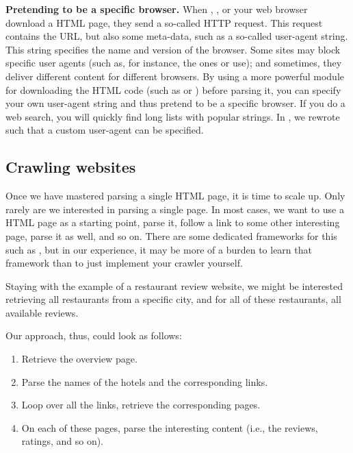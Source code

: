 \begin{feature}\textbf{Pretending to be a specific browser.}  When , , or your web browser download a HTML page, they send a so-called HTTP request. This request contains the URL, but also some meta-data, such as a so-called user-agent string. This string specifies the name and version of the browser. Some sites may block specific user agents (such as, for instance, the ones  or  use); and sometimes, they deliver different content for different browsers. By using a more powerful module for downloading the HTML code (such as  or ) before parsing it, you can specify your own user-agent string and thus pretend to be a specific browser. If you do a web search, you will quickly find long lists with popular strings. In , we rewrote  such that a custom user-agent can be specified. 
\end{feature}





\subsection{Crawling websites}
\label{sec:crawling}

Once we have mastered parsing a single HTML page, it is time to scale
up. Only rarely are we interested in parsing a single page. In most
cases, we want to use a HTML page as a starting point, parse it,
follow a link to some other interesting page, parse it as well, and so
on. There are some dedicated frameworks for this such as ,
but in our experience, it may be more of a burden to learn that
framework than to just implement your crawler yourself.

Staying with the example of a restaurant review website, we might be
interested retrieving all restaurants from a specific city, and for
all of these restaurants, all available reviews.

Our approach, thus, could look as follows:

\begin{enumerate}
	\item Retrieve the overview page.
	\item Parse the names of the hotels and the corresponding links.
	\item Loop over all the links, retrieve the corresponding pages.
	\item On each of these pages, parse the interesting content (i.e., the reviews, ratings, and so on).
\end{enumerate}

